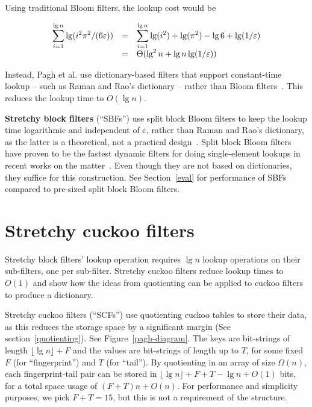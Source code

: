 \documentclass[letterpaper,twocolumn,10pt]{article}
\newcommand{\etal}{et al.}
\newcommand{\Taffy}{Stretchy}
\newcommand{\TBF}{SBF}
\newcommand{\TCF}{SCF}
\newcommand{\Taffy}{Taffy}
\newcommand{\TBF}{TBF}
\newcommand{\TCF}{TCF}
\begin{document}
Using traditional Bloom filters, the lookup cost would be

\[
\begin{array}{r c l}
\displaystyle\sum_{i=1}^{\lg n} \lg (i^2 \pi^2 /(6 \varepsilon)) & = &
 \displaystyle\sum_{i=1}^{\lg n} \lg (i^2) + \lg( \pi^2) - \lg 6 + \lg (1/\varepsilon) \\
& = & \Theta(\lg^2 n + \lg n \lg (1/\varepsilon))
\end{array}
\]

Instead, Pagh \etal{} use dictionary-based filters that support constant-time lookup -- such as Raman and Rao's dictionary -- rather than Bloom filters~\cite{succinct,psw}.
This reduces the lookup time to $O(\lg n)$.

{\bf \Taffy{} block filters} (``\TBF{}s'') use split block Bloom filters to keep the lookup time logarithmic and independent of $\varepsilon$, rather than Raman and Rao's dictionary, as the latter is a theoretical, not a practical design~\cite{psw,succinct}.
Split block Bloom filters have proven to be the fastest dynamic filters for doing single-element lookups in recent works on the matter~\cite{overtakes,ribbon,bloom-simd}.
Even though they are not based on dictionaries, they suffice for this construction.
See Section~\ref{eval} for performance of \TBF{}s compared to pre-sized split block Bloom filters.


\section{\Taffy{} cuckoo filters}
\label{tcf}

\Taffy{} block filters' lookup operation requires $\lg n$ lookup operations on their sub-filters, one per sub-filter.
\Taffy{} cuckoo filters reduce lookup times to $O(1)$ and show how the ideas from quotienting can be applied to cuckoo filters to produce a dictionary.

\Taffy{} cuckoo filters (``\TCF{}s'') use quotienting cuckoo tables %
to store their data, as this reduces the storage space by a significant margin (See section~\ref{quotienting}).
See Figure~\ref{pagh-diagram}.
The keys are bit-strings of length $\lfloor \lg n \rfloor + F$ and the values are bit-strings of length up to $T$, for some fixed $F$ (for ``fingerprint'') and $T$ (for ``tail'').
By quotienting in an array of size $\Omega(n)$, each fingerprint-tail pair can be stored in $\lfloor \lg n \rfloor + F + T - \lg n + O(1)$ bits, for a total space usage of $(F+T)n + O(n)$.
For performance and simplicity purposes, we pick $F + T = 15$, but this is not a requirement of the structure.
\end{document}
